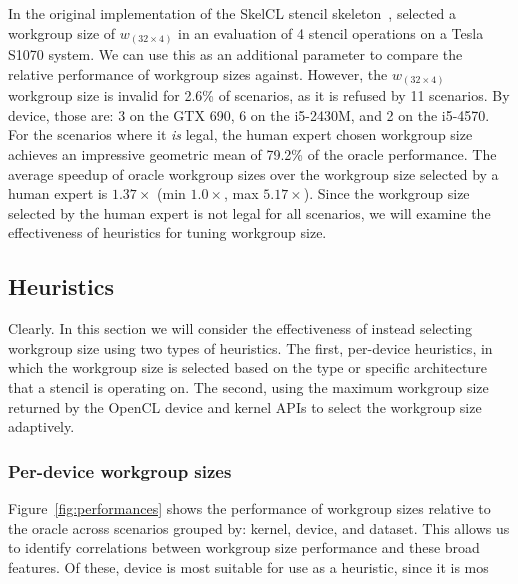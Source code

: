 In the original implementation of the SkelCL stencil
skeleton~\cite{Breuer2013}, \citeauthor{Breuer2013} selected a
workgroup size of $w_{(32 \times 4)}$ in an evaluation of 4 stencil
operations on a Tesla S1070 system. We can use this as an additional
parameter to compare the relative performance of workgroup sizes
against. However, the $w_{(32 \times 4)}$ workgroup size is invalid
for 2.6\% of scenarios, as it is refused by 11 scenarios. By device,
those are: 3 on the GTX 690, 6 on the i5-2430M, and 2 on the i5-4570.
For the scenarios where it \emph{is} legal, the human expert chosen
workgroup size achieves an impressive geometric mean of 79.2\% of the
oracle performance. The average speedup of oracle workgroup sizes over
the workgroup size selected by a human expert is $1.37\times$ (min
$1.0\times$, max $5.17\times$). Since the workgroup size selected by
the human expert is not legal for all scenarios, we will examine the
effectiveness of heuristics for tuning workgroup size.


\subsection{Heuristics}\label{subsec:heuristics}

Clearly\TODO{\ldots}. In this section we will consider the
effectiveness of instead selecting workgroup size using two types of
heuristics. The first, per-device heuristics, in which the workgroup
size is selected based on the type or specific architecture that a
stencil is operating on. The second, using the maximum workgroup size
returned by the OpenCL device and kernel APIs to select the workgroup
size adaptively.

\begin{table}
\scriptsize
\centering
{}

\caption{%
  Selecting workgroup size using a per-device heuristic. The mode
  optimal workgroup size for each device type $\bar{w}$ is evaluated
  based on legality, and relative performance to the oracle (minimum
  and average) when legal.%
}
\label{tab:hosts}
\end{table}

\subsubsection{Per-device workgroup sizes}

Figure~\ref{fig:performances} shows the performance of workgroup sizes
relative to the oracle across scenarios grouped by: kernel, device,
and dataset. This allows us to identify correlations between workgroup
size performance and these broad features. Of these, device is most
suitable for use as a heuristic, since it is mos


